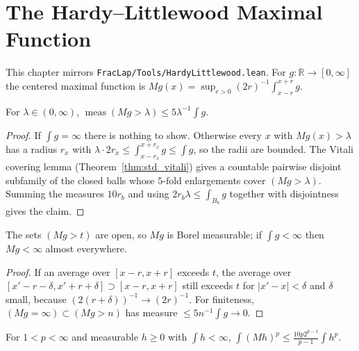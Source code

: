 \chapter{The Hardy--Littlewood Maximal Function}

This chapter mirrors \texttt{FracLap/Tools/HardyLittlewood.lean}. For $g : \mathbb{R} \to [0, \infty]$ the centered maximal function is $M g(x) = \sup_{r > 0} (2r)^{-1} \int_{x-r}^{x+r} g$.

\begin{theorem}\label{thm:hl_weak}
\leanok
For $\lambda \in (0, \infty)$, $\operatorname{meas}(M g > \lambda) \le 5 \lambda^{-1} \int g$.
\end{theorem}

\begin{proof}
\leanok
If $\int g = \infty$ there is nothing to show. Otherwise every $x$ with $Mg(x) > \lambda$ has a radius $r_x$ with $\lambda \cdot 2 r_x \le \int_{x - r_x}^{x + r_x} g \le \int g$, so the radii are bounded. The Vitali covering lemma (Theorem~\ref{thm:std_vitali}) gives a countable pairwise disjoint subfamily of the closed balls whose $5$-fold enlargements cover $(M g > \lambda)$. Summing the measures $10 r_b$ and using $2 r_b \lambda \le \int_{B_b} g$ together with disjointness gives the claim.
\end{proof}

\begin{lemma}\label{lem:hl_measurable}
\leanok
The sets $(M g > t)$ are open, so $M g$ is Borel measurable; if $\int g < \infty$ then $M g < \infty$ almost everywhere.
\end{lemma}

\begin{proof}
\leanok
If an average over $[x-r, x+r]$ exceeds $t$, the average over $[x'-r-\delta, x'+r+\delta] \supset [x-r, x+r]$ still exceeds $t$ for $|x'-x| < \delta$ and $\delta$ small, because $(2(r+\delta))^{-1} \to (2r)^{-1}$. For finiteness, $(M g = \infty) \subset (M g > n)$ has measure $\le 5 n^{-1}\int g \to 0$.
\end{proof}

\begin{theorem}\label{thm:hl_strong}
\leanok
For $1 < p < \infty$ and measurable $h \ge 0$ with $\int h < \infty$, $\int (M h)^p \le \frac{10 p 2^{p-1}}{p-1} \int h^p$.
\end{theorem}

